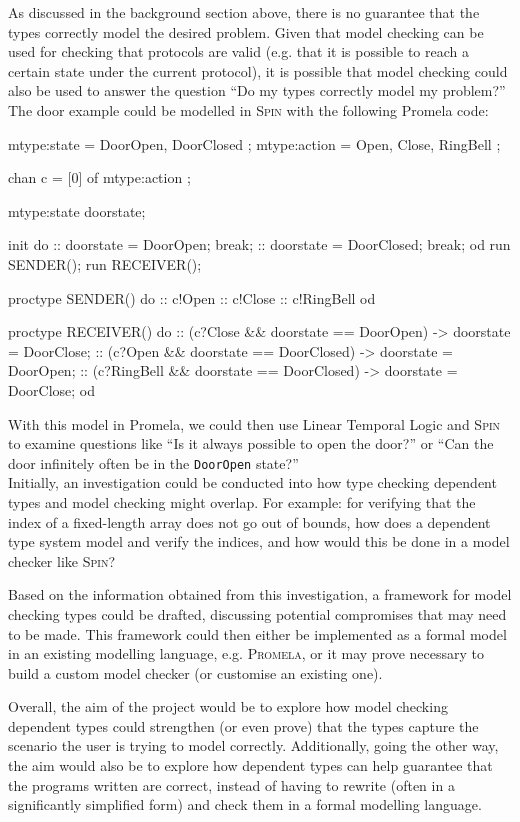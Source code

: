 \documentclass[11pt]{article}
\begin{document}
    As discussed in the background section above, there is no guarantee that the
    types correctly model the desired problem. Given that model checking can be
    used for checking that protocols are valid (e.g. that it is possible to
    reach a certain state under the current protocol), it is possible that model
    checking could also be used to answer the question ``Do my types correctly
    model my problem?'' The door example could be modelled in \textsc{Spin} with
    the following Promela code:
    \begin{code}
mtype:state = { DoorOpen, DoorClosed };
mtype:action = { Open, Close, RingBell };

chan c = [0] of { mtype:action };

mtype:state doorstate;

init
{
    do
    :: doorstate = DoorOpen; break;
    :: doorstate = DoorClosed; break;
    od
    run SENDER();
    run RECEIVER();
}

proctype SENDER()
{
    do
    :: c!Open
    :: c!Close
    :: c!RingBell
    od
}

proctype RECEIVER()
{
    do
    :: (c?Close && doorstate == DoorOpen) ->
           doorstate = DoorClose;
    :: (c?Open && doorstate == DoorClosed) ->
           doorstate = DoorOpen;
    :: (c?RingBell && doorstate == DoorClosed) ->
           doorstate = DoorClose;
    od
}
    \end{code}
    With this model in Promela, we could then use Linear Temporal Logic and
    \textsc{Spin} to examine questions like ``Is it always possible to open the
    door?'' or ``Can the door infinitely often be in the \texttt{DoorOpen}
    state?''\\
    
    Initially, an investigation could be conducted into how type checking
    dependent types and model checking might overlap. For example: for
    verifying that the index of a fixed-length array does not go out of bounds,
    how does a dependent type system model and verify the indices, and how
    would this be done in a model checker like \textsc{Spin}?
    
    Based on the information obtained from this investigation, a framework for
    model checking types could be drafted, discussing potential compromises
    that may need to be made. This framework could then either be implemented
    as a formal model in an existing modelling language, e.g. \textsc{Promela},
    or it may prove necessary to build a custom model checker (or customise an
    existing one).
    
    Overall, the aim of the project would be to explore how model checking
    dependent types could strengthen (or even prove) that the types capture the
    scenario the user is trying to model correctly. Additionally, going the
    other way, the aim would also be to explore how dependent types can help
    guarantee that the programs written are correct, instead of having to
    rewrite (often in a significantly simplified form) and check them in a
    formal modelling language.
    
    \newpage
    
    \printbibliography
    
\end{document}
